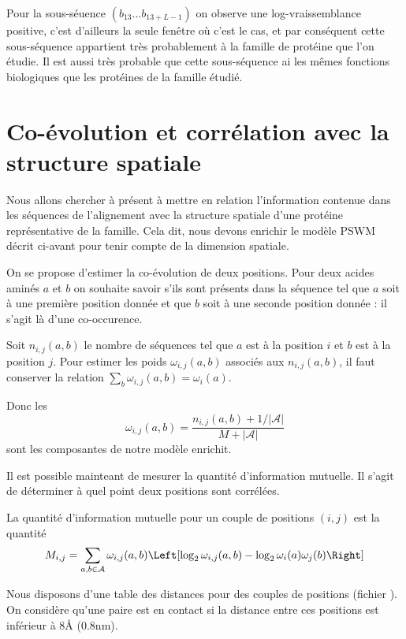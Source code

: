 \documentclass[a4paper, french]{article}
\begin{document}
Pour la sous-s\'euence $(b_{13}\ldots b_{13+L-1})$ on observe une
log-vraissemblance positive, c'est d'ailleurs la seule fen\^etre o\`u
c'est le cas, et par cons\'equent cette sous-s\'equence
appartient tr\`es probablement \`a la famille de prot\'eine que l'on \'etudie.
Il est aussi tr\`es probable que cette sous-s\'equence
ai les m\^emes fonctions biologiques que les prot\'eines
de la famille \'etudi\'e.

\section{Co-\'evolution et corr\'elation avec la structure spatiale}

Nous allons chercher \`a pr\'esent \`a mettre en relation l'information
contenue dans les s\'equences de l'alignement
avec la structure spatiale d'une prot\'eine repr\'esentative de la famille.
Cela dit, nous devons enrichir le mod\`ele
PSWM d\'ecrit ci-avant pour tenir compte de la dimension spatiale.

On se propose d'estimer la co-\'evolution de deux positions. Pour deux
acides amin\'es $a$ et $b$ on souhaite savoir s'ils sont pr\'esents dans la
s\'equence tel que $a$ soit \`a une premi\`ere position donn\'ee et que $b$ soit
\`a une seconde position donn\'ee : il s'agit l\`a d'une co-occurence.

Soit $n_{i,j}(a,b)$ le nombre de s\'equences tel que 
$a$ est \`a la position $i$ et $b$ est \`a la position $j$.
Pour estimer les poids $\omega_{i,j}(a,b)$ associ\'es aux $n_{i,j}(a,b)$,
il faut conserver la relation $\sum_b \omega_{i,j}(a,b)=\omega_i(a)$.

Donc les
\begin{equation*}
    \omega_{i,j}(a,b)=
    \frac{n_{i,j}(a,b) + 1/|\mathcal{A}|}{M+|\mathcal{A}|}
\end{equation*}
sont les composantes de notre mod\`ele enrichit.

Il est possible mainteant de mesurer la quantit\'e d'information mutuelle.
Il s'agit de d\'eterminer \`a quel point deux positions sont corr\'el\'ees.

La quantit\'e d'information mutuelle pour un couple de positions
$(i,j)$ est la quantit\'e
\begin{equation*}
    M_{i,j}=\sum_{a,b\in\mathcal{A}}\omega_{i,j}(a,b)
    \Left[\log_2{\omega_{i,j}(a,b)}-\log_2{\omega_i(a)\omega_j(b)}\Right]
\end{equation*}

Nous disposons d'une table des distances pour des couples de positions
(fichier ). On consid\`ere qu'une paire est en
contact si la distance entre ces positions est inf\'erieur \`a 8\r A (0.8nm).
\end{document}

